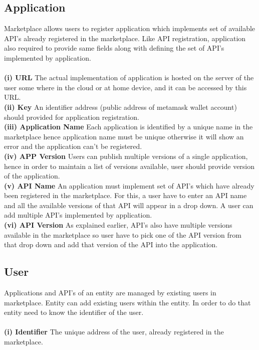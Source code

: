 \subsection {Application}
Marketplace allows users to register application which implements set of available API's already registered in the marketplace. Like API registration, application also required to provide same fields along with defining the set of API's implemented by application.\\\\
\textbf{(i) URL}
The actual implementation of application is hosted on the server of the user some where in the cloud or at home device, and it can be accessed by this URL.\\
\textbf{(ii) Key}
An identifier address (public address of metamask wallet account) should provided for application registration.\\
\textbf{(iii) Application Name} 
Each application is identified by a unique name in the marketplace hence application name must be unique otherwise it will show an error and the application can't be registered.\\
\textbf{(iv) APP Version}
Users can publish multiple versions of a single application, hence in order to maintain a list of versions available, user should provide version of the application.\\
\textbf{(v) API Name}
An application must implement set of API's which have already been registered in the marketplace. For this, a user have to enter an API name and all the available versions of that API will appear in a drop down. A user can add multiple API's implemented by application.\\
\textbf{(vi) API Version}
As explained earlier, API's also have multiple versions available in the marketplace so user have to pick one of the API version from that drop down and add that version of the API into the application.

\subsection {User} Applications and API's of an entity are managed by existing users in marketplace. Entity can add existing users within the entity. In order to do that entity need to know the identifier of the user.\\\\
\textbf{(i) Identifier}
The unique address of the user, already registered in the marketplace.\\

